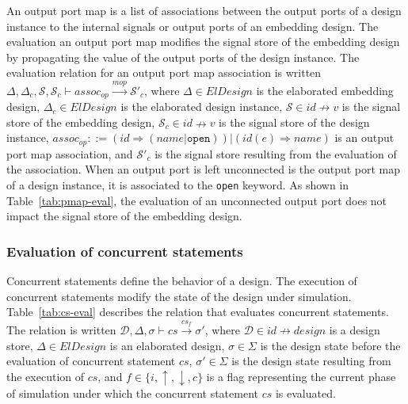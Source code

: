 An output port map is a list of associations between the output ports
of a design instance to the internal signals or output ports of an
embedding design.  The evaluation an output port map modifies the
signal store of the embedding design by propagating the value of the
output ports of the design instance. The evaluation relation for an
output port map association is written
$\Delta,\Delta_c,\mathcal{S},\mathcal{S}_c\vdash{}assoc_{op}\xrightarrow{mop}\mathcal{S}'_c$,
where $\Delta\in{}ElDesign$ is the elaborated embedding design,
$\Delta_c\in{}ElDesign$ is the elaborated design instance,
$\mathcal{S}\in{}id\nrightarrow{}v$ is the signal store of the
embedding design, $\mathcal{S}_c\in{}id\nrightarrow{}v$ is the signal
store of the design instance,
$assoc_{op}::=(id\Rightarrow{}(name|\mathtt{open}))\big|(id(e)\Rightarrow{}name)$
is an output port map association, and $\mathcal{S}'_c$ is the signal
store resulting from the evaluation of the association. When an output
port is left unconnected is the output port map of a design instance,
it is associated to the \texttt{open} keyword. As shown in
Table~\ref{tab:pmap-eval}, the evaluation of an unconnected output
port does not impact the signal store of the embedding design.

\subsubsection{Evaluation of concurrent statements}
\label{subsubsec:cs-eval}

Concurrent statements define the behavior of a \hvhdl{} design. The
execution of concurrent statements modify the state of the \hvhdl{}
design under simulation. Table~\ref{tab:cs-eval} describes the
relation that evaluates concurrent statements. The relation is written
$\mathcal{D},\Delta,\sigma\vdash{}cs\xrightarrow{cs_f}\sigma'$, where
$\mathcal{D}\in{}id\nrightarrow{}design$ is a design store,
$\Delta\in{}ElDesign$ is an elaborated design, $\sigma\in\Sigma$ is
the design state before the evaluation of concurrent statement $cs$,
$\sigma'\in\Sigma$ is the design state resulting from the execution of
$cs$, and $f\in\{i,\uparrow,\downarrow,c\}$ is a flag representing the
current phase of simulation under which the concurrent statement $cs$
is evaluated.

